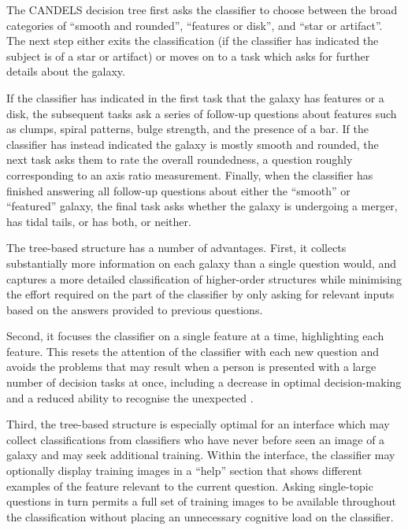 \documentclass[useAMS,usenatbib]{mn2e}
\begin{document}
{The CANDELS decision tree first asks the classifier to choose between the broad categories of ``smooth and rounded'', ``features or disk'', and ``star or artifact''. The next step either exits the classification (if the classifier has indicated the subject is of a star or artifact) or moves on to a task which asks for further details about the galaxy. 

If the classifier has indicated in the first task that the galaxy has features or a disk, the subsequent tasks ask a series of follow-up questions about features such as clumps, spiral patterns, bulge strength, and the presence of a bar. If the classifier has instead indicated the galaxy is mostly smooth and rounded, the next task asks them to rate the overall roundedness, a question roughly corresponding to an axis ratio measurement. Finally, when the classifier has finished answering all follow-up questions about either the ``smooth'' or ``featured'' galaxy, the final task asks whether the galaxy is undergoing a merger, has tidal tails, or has both, or neither.

The tree-based structure has a number of advantages. First, it collects substantially more information on each galaxy than a single question would, and captures a more detailed classification of higher-order structures while minimising the effort required on the part of the classifier by only asking for relevant inputs based on the answers provided to previous questions. 

Second, it focuses the classifier on a single feature at a time, highlighting each feature. This resets the attention of the classifier with each new question and avoids the problems that may result when a person is presented with a large number of decision tasks at once, including a decrease in optimal decision-making \citep{iyengar00,crescenzi13, besedes15} and a reduced ability to recognise the unexpected \citep{simons99,todd05}. 

Third, the tree-based structure is especially optimal for an interface which may collect classifications from classifiers who have never before seen an image of a galaxy and may seek additional training. Within the interface, the classifier may optionally display training images in a ``help'' section that shows different examples of the feature relevant to the current question. Asking single-topic questions in turn permits a full set of training images to be available throughout the classification without placing an unnecessary cognitive load on the classifier.

}
\end{document}
